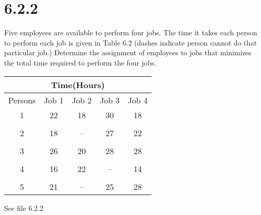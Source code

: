\documentclass{article}
\begin{document}
\section*{6.2.2}
Five employees are available to perform four jobs. The time it takes each person to perform each job is given in Table 6.2 (dashes indicate person cannot do that particular job.) Determine the assignment of employees to jobs that minimizes the total time required to perform the four jobs.
\begin{table}[h!]
    \centering
    \begin{tabular}{| c | c c c c |}
        \hline
        \multicolumn{5}{|c|}{Time(Hours)} \\
        \hline
        Persons & Job 1 & Job 2 & Job 3 & Job 4\\
        \hline
        1& 22 & 18 & 30 & 18\\
        &&&&\\
        2& 18 & -- & 27 & 22\\
        &&&&\\
        3& 26 & 20 & 28 & 28\\
        &&&&\\
        4& 16 & 22 & -- & 14\\
        &&&&\\
        5& 21 & -- & 25 & 28\\
        \hline
    \end{tabular}
\end{table}

See file 6.2.2
\end{document}
